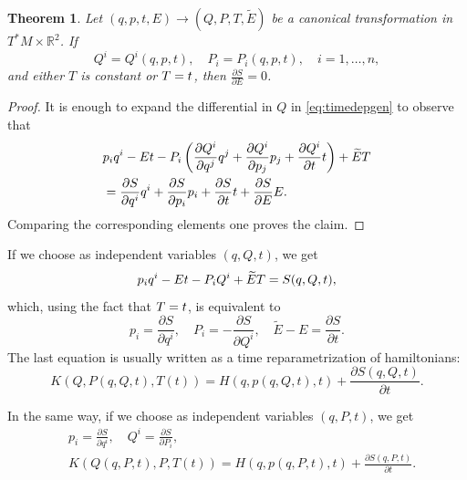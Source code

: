 \documentclass[english,fontsize=11pt,paper=a5,oneside]{scrbook}
\newcommand{\R}{\mathbb{R}}
\let\d\relax
\newcommand{\d}{\mathrm{d}}
\newtheorem{theorem}{Theorem}[chapter]
\theoremstyle{definition}
\begin{document}
\begin{theorem}\label{thm:Ham0}
  Let $(q,p,t,E) \to (Q,P,T,\widetilde E)$ be a canonical transformation in $T^*M\times \R^2$. If
  \begin{equation}
    Q^i = Q^i(q,p,t), \quad P_i = P_i(q,p,t), \quad i=1,\ldots,n,
  \end{equation}
  and either $T$ is constant or $\d T = \d t$, then $\frac{\partial S}{\partial E} = 0$.
\end{theorem}
\begin{proof}
  It is enough to expand the differential in $Q$ in \eqref{eq:timedepgen} to observe that
  \begin{align}
     & p_i \d q^i -E \d t - P_i \left(
    \frac{\partial Q^i}{\partial q^j}\d q^j
    +\frac{\partial Q^i}{\partial p_j}\d p_j
    +\frac{\partial Q^i}{\partial t}\d t
    \right) + \widetilde E \d T        \\
     & =
    \frac{\partial S}{\partial q^i}\d q^i
    +\frac{\partial S}{\partial p_i}\d p_i
    +\frac{\partial S}{\partial t}\d t
    +\frac{\partial S}{\partial E}\d E.
  \end{align}
  Comparing the corresponding elements one proves the claim.
\end{proof}

If we choose as independent variables $(q,Q,t)$, we get
\begin{equation}
  p_i \d q^i - E \d t -P_i \d Q^i + \widetilde E\d T = \d S(q,Q,t),
\end{equation}
which, using the fact that $\d T = \d t$, is equivalent to
\begin{equation}\label{eq:motionpPEtE}
  p_i = \frac{\partial S}{\partial q^i}, \quad
  P_i = - \frac{\partial S}{\partial Q^i}, \quad
  \widetilde E - E = \frac{\partial S}{\partial t}.
\end{equation}
The last equation is usually written as a time reparametrization of hamiltonians:
\begin{equation}\label{eq:time-reparamqQt}
  K(Q, P(q,Q,t), T(t)) = H(q,p(q,Q,t),t) + \frac{\partial S(q,Q,t)}{\partial t}.
\end{equation}

In the same way, if we choose as independent variables $(q,P,t)$, we get
\begin{align}
   & p_i = \frac{\partial S}{\partial q^i}, \quad Q^i = \frac{\partial S}{\partial P_i},                       \\
   & K(Q(q,P,t), P, T(t)) = H(q, p(q,P,t),t) + \frac{\partial S(q,P,t)}{\partial t}.\label{eq:time-reparamqPt}
\end{align}
\end{document}
